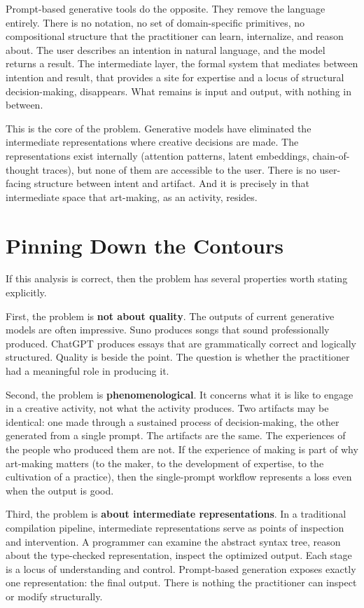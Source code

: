 \documentclass[11pt]{article}
\begin{document}
Prompt-based generative tools do the opposite. They remove the language entirely. There is no notation, no set of domain-specific primitives, no compositional structure that the practitioner can learn, internalize, and reason about. The user describes an intention in natural language, and the model returns a result. The intermediate layer, the formal system that mediates between intention and result, that provides a site for expertise and a locus of structural decision-making, disappears. What remains is input and output, with nothing in between.

This is the core of the problem. Generative models have eliminated the intermediate representations where creative decisions are made. The representations exist internally (attention patterns, latent embeddings, chain-of-thought traces), but none of them are accessible to the user. There is no user-facing structure between intent and artifact. And it is precisely in that intermediate space that art-making, as an activity, resides.

\section{Pinning Down the Contours}

If this analysis is correct, then the problem has several properties worth stating explicitly.

First, the problem is \textbf{not about quality}. The outputs of current generative models are often impressive. Suno produces songs that sound professionally produced. ChatGPT produces essays that are grammatically correct and logically structured. Quality is beside the point. The question is whether the practitioner had a meaningful role in producing it.

Second, the problem is \textbf{phenomenological}. It concerns what it is like to engage in a creative activity, not what the activity produces. Two artifacts may be identical: one made through a sustained process of decision-making, the other generated from a single prompt. The artifacts are the same. The experiences of the people who produced them are not. If the experience of making is part of why art-making matters (to the maker, to the development of expertise, to the cultivation of a practice), then the single-prompt workflow represents a loss even when the output is good.

Third, the problem is \textbf{about intermediate representations}. In a traditional compilation pipeline, intermediate representations serve as points of inspection and intervention. A programmer can examine the abstract syntax tree, reason about the type-checked representation, inspect the optimized output. Each stage is a locus of understanding and control. Prompt-based generation exposes exactly one representation: the final output. There is nothing the practitioner can inspect or modify structurally.
\end{document}
